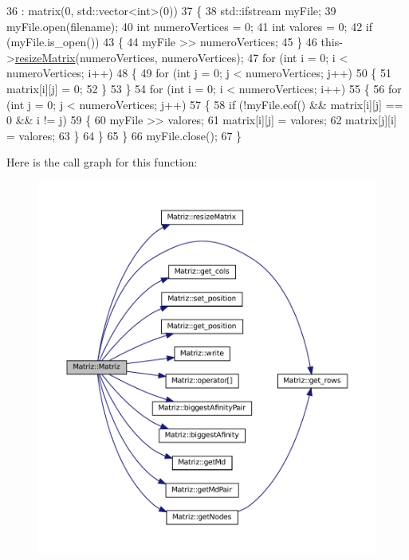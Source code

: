 \begin{DoxyCode}
36                              : matrix(0, std::vector<int>(0))
37   \{
38     std::ifstream myFile;
39     myFile.open(filename);
40     \textcolor{keywordtype}{int} numeroVertices = 0;
41     \textcolor{keywordtype}{int} valores = 0;
42     \textcolor{keywordflow}{if} (myFile.is\_open())
43     \{
44       myFile >> numeroVertices;
45     \}
46     this->\hyperlink{classMatriz_aa929f933e9088dc0efecaa9a46d555d9}{resizeMatrix}(numeroVertices, numeroVertices);
47     \textcolor{keywordflow}{for} (\textcolor{keywordtype}{int} i = 0; i < numeroVertices; i++)
48     \{
49       \textcolor{keywordflow}{for} (\textcolor{keywordtype}{int} j = 0; j < numeroVertices; j++)
50       \{
51         matrix[i][j] = 0;
52       \}
53     \}
54     \textcolor{keywordflow}{for} (\textcolor{keywordtype}{int} i = 0; i < numeroVertices; i++)
55     \{
56       \textcolor{keywordflow}{for} (\textcolor{keywordtype}{int} j = 0; j < numeroVertices; j++)
57       \{
58         \textcolor{keywordflow}{if} (!myFile.eof() && matrix[i][j] == 0 && i != j)
59         \{
60           myFile >> valores;
61           matrix[i][j] = valores;
62           matrix[j][i] = valores;
63         \}
64       \}
65     \}
66     myFile.close();
67   \}
\end{DoxyCode}
Here is the call graph for this function\+:
\nopagebreak
\begin{figure}[H]
\begin{center}
\leavevmode
\includegraphics[width=350pt]{classMatriz_a388709cfee356a0c78b66e3f538e9318_cgraph}
\end{center}
\end{figure}


